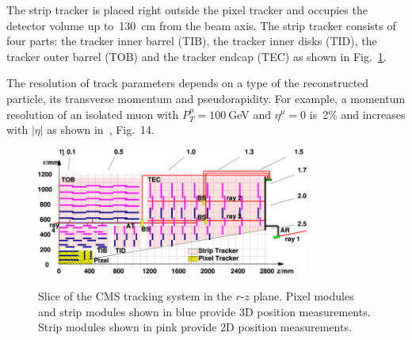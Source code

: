 
The strip tracker is placed right outside the pixel tracker and occupies the detector volume up to~130~cm from the beam axis. The strip tracker consists of four parts: the tracker inner barrel (TIB), the tracker inner disks (TID), the tracker outer barrel (TOB) and the tracker endcap (TEC) as shown in Fig.~\ref{fig:tracker_slice}. %

The resolution of track parameters depends on a type of the reconstructed particle, its transverse momentum and pseudorapidity. For example, a momentum resolution of an isolated muon with $P_T^{\mu}=100~$GeV and $\eta^{\mu}=0$ is~2\% and increases with $|\eta|$ as shown in~\cite{ref_trackerPerformance}, Fig.~14.  




\begin{figure}[htb]
  \begin{center}
    {\includegraphics[width=0.8\textwidth]{../figs/Exp/tracker_slice.png}}
    \caption{Slice of the CMS tracking system in the $r$-$z$ plane. Pixel modules and strip modules shown in blue provide 3D position measurements. Strip modules shown in pink provide 2D position measurements. }
    \label{fig:tracker_slice}
  \end{center}
\end{figure}

